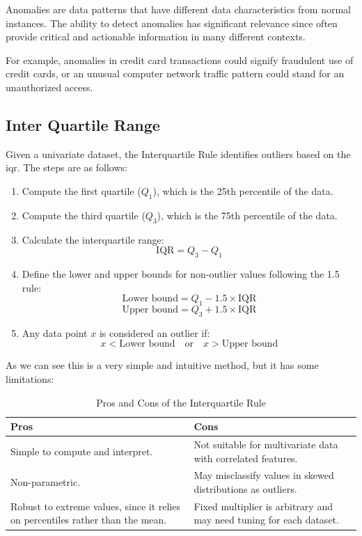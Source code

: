 \documentclass[11pt,english,a4paper,hidelinks]{book}
\begin{document}
Anomalies are data patterns that have different data characteristics from normal
instances. The ability to detect anomalies has significant relevance since often provide critical and actionable information in many different contexts.

\vspace{0.5cm}
\noindent For example, anomalies in credit card transactions could signify fraudulent use of
credit cards, or an unusual computer network traffic pattern could stand for an
unauthorized access.


\subsection{Inter Quartile Range}

Given a univariate dataset, the Interquartile Rule identifies outliers based on the \acrshort{iqr}. The steps are as follows:

\begin{enumerate}
    \item Compute the first quartile (\(Q_1\)), which is the 25th percentile of the data.
    \item Compute the third quartile (\(Q_3\)), which is the 75th percentile of the data.
    \item Calculate the interquartile range:
    \[
        \text{IQR} = Q_3 - Q_1
    \]
    \item Define the lower and upper bounds for non-outlier values following the 1.5 rule:
    \[
        \text{Lower bound} = Q_1 - 1.5 \times \text{IQR}
    \]
    \[
        \text{Upper bound} = Q_3 + 1.5 \times \text{IQR}
    \]
    \item Any data point \(x\) is considered an outlier if:
    \[
        x < \text{Lower bound} \quad \text{or} \quad x > \text{Upper bound}
    \]
\end{enumerate}

\noindent As we can see this is a very simple and intuitive method, but it has some limitations:

\begin{table}[H]
    \centering
    \begin{tabular}{|p{7cm}|p{7cm}|}
    \hline
    \textbf{Pros} & \textbf{Cons} \\
    \hline
    Simple to compute and interpret. & Not suitable for multivariate data with correlated features. \\
    \hline
    Non-parametric. & May misclassify values in skewed distributions as outliers. \\
    \hline
    Robust to extreme values, since it relies on percentiles rather than the mean. & Fixed multiplier is arbitrary and may need tuning for each dataset. \\
    \hline
    \end{tabular}
    \caption{Pros and Cons of the Interquartile Rule}
\end{table}
\end{document}
